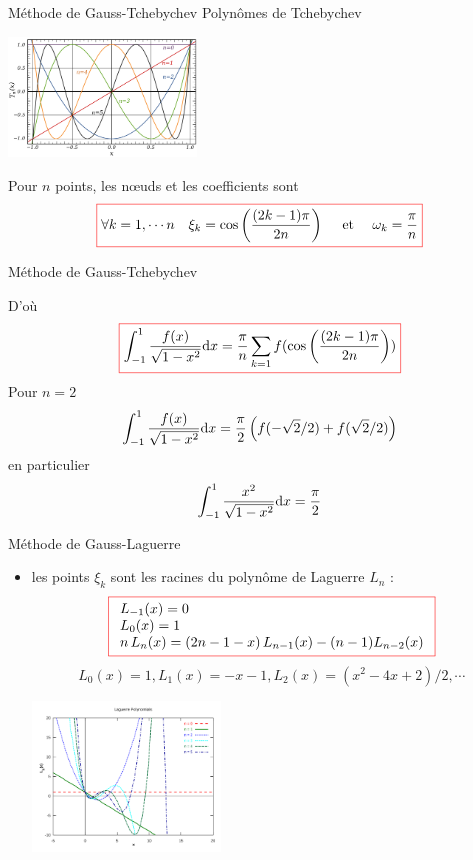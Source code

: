 \documentclass{beamer}
\def \de {{\rm d}}
\newcommand{\myredbox}[1]{\fcolorbox{red}{white}{$\displaystyle#1$}}
\begin{document}
\begin{frame}
\begin{block}{Méthode de Gauss-Tchebychev}
Polynômes de Tchebychev
\begin{center}
\includegraphics[width=5cm]{Chebyshev_Polynomials.png}
\end{center}
Pour $n$ points, les nœuds et les coefficients  sont
\[\myredbox{\forall k =1,\cdots n\quad  \xi_k = \cos \left(\frac{(2k-1)\pi}{2n}\right) \quad\mbox{ et }\quad \omega_k=\frac{\pi}{n} }\]

\end{block}
\end{frame}


\begin{frame}
\begin{block}{Méthode de Gauss-Tchebychev}

D'où
\[\myredbox{\int_{-1}^1\frac{f(x)}{\sqrt{1-x^2}}\de x =\frac{\pi}{n}\sum_{k=1}f( \cos \left(\frac{(2k-1)\pi}{2n}\right))}\]
Pour $n=2$
\[\int_{-1}^1\frac{f(x)}{\sqrt{1-x^2}}\de x =\frac{\pi}{2}\left( f( -\sqrt{2}/2)+f(\sqrt{2}/2)\right)\]
en particulier 
\[\int_{-1}^1\frac{x^2}{\sqrt{1-x^2}}\de x =\frac{\pi}{2}\]
\end{block}
\end{frame}

\begin{frame}
\begin{block}{Méthode de Gauss-Laguerre}
\begin{itemize}
\item les points $\xi_k$ sont les racines du polynôme de Laguerre $L_n$ :
\[
\myredbox{
\begin{array}{l}
L_{-1}(x)=0 \\
L_0(x)=1\\
n\,L_n(x)=(2n-1-x)\,L_{n-1}(x)-(n-1) L_{n-2}(x)
\end{array}
}\]
\[L_0(x)=1, L_1(x)=-x-1, L_2(x)=(x^2-4x+2)/2, \cdots\]

\begin{center}
\includegraphics[width=5cm]{Laguerre_poly.png}
\end{center}
\end{itemize}
\end{block}
\end{frame}
\end{document}

